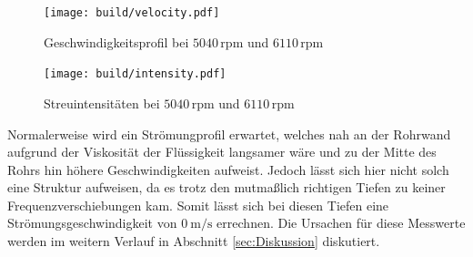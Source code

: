 \begin{figure}
    \centering
    \caption{Geschwindigkeitsprofil bei $5040 \, \text{rpm}$ und $6110 \, \text{rpm}$}
    \label{fig:velocity}
    \texttt{[image: build/velocity.pdf]}
\end{figure}
\begin{figure}
    \centering
    \caption{Streuintensitäten bei $5040 \, \text{rpm}$ und $6110 \, \text{rpm}$}
    \label{fig:intensity}
    \texttt{[image: build/intensity.pdf]}
\end{figure}
Normalerweise wird ein Strömungprofil erwartet, welches nah an der Rohrwand aufgrund der Viskosität der Flüssigkeit langsamer wäre und zu der Mitte des 
Rohrs hin höhere Geschwindigkeiten aufweist.
Jedoch lässt sich hier nicht solch eine Struktur aufweisen, da es trotz den mutmaßlich richtigen Tiefen zu keiner Frequenzverschiebungen kam.
Somit lässt sich bei diesen Tiefen eine Strömungsgeschwindigkeit von $\SI{0}{\metre\per\second}$ errechnen.
Die Ursachen für diese Messwerte werden im weitern Verlauf in Abschnitt \ref{sec:Diskussion} diskutiert.